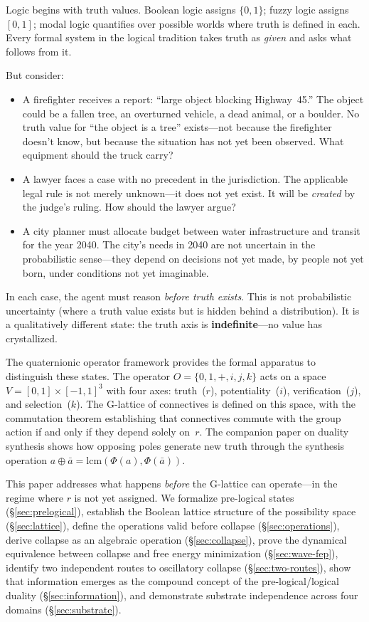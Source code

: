 \documentclass[11pt,a4paper]{article}
\begin{document}
Logic begins with truth values. Boolean logic assigns $\{0,1\}$; fuzzy
logic assigns $[0,1]$; modal logic quantifies over possible worlds where
truth is defined in each. Every formal system in the logical tradition
takes truth as \emph{given} and asks what follows from it.

But consider:
\begin{itemize}[nosep]
\item A firefighter receives a report: ``large object blocking Highway~45.''
  The object could be a fallen tree, an overturned vehicle, a dead animal,
  or a boulder. No truth value for ``the object is a tree'' exists---not
  because the firefighter doesn't know, but because the situation has not
  yet been observed. What equipment should the truck carry?
\item A lawyer faces a case with no precedent in the jurisdiction.
  The applicable legal rule is not merely unknown---it does not yet exist.
  It will be \emph{created} by the judge's ruling. How should the lawyer
  argue?
\item A city planner must allocate budget between water infrastructure and
  transit for the year 2040. The city's needs in 2040 are not uncertain in
  the probabilistic sense---they depend on decisions not yet made, by people
  not yet born, under conditions not yet imaginable.
\end{itemize}

In each case, the agent must reason \emph{before truth exists}. This is
not probabilistic uncertainty (where a truth value exists but is hidden
behind a distribution). It is a qualitatively different state: the truth
axis is \textbf{indefinite}---no value has crystallized.

The quaternionic operator framework \citep{p11} provides the formal
apparatus to distinguish these states. The operator
$O = \{0,1,+,i,j,k\}$ acts on a space $V = [0,1] \times [-1,1]^3$
with four axes: truth~($r$), potentiality~($i$), verification~($j$),
and selection~($k$). The G-lattice of connectives is defined on this
space, with the commutation theorem establishing that connectives commute
with the group action if and only if they depend solely on~$r$. The
companion paper on duality synthesis \citep{p12} shows how opposing
poles generate new truth through the synthesis operation
$a \oplus \bar{a} = \mathrm{lcm}(\Phi(a), \Phi(\bar{a}))$.

This paper addresses what happens \emph{before} the G-lattice can
operate---in the regime where $r$ is not yet assigned. We formalize
pre-logical states (\S\ref{sec:prelogical}), establish the Boolean
lattice structure of the possibility space (\S\ref{sec:lattice}), define
the operations valid before collapse (\S\ref{sec:operations}), derive
collapse as an algebraic operation (\S\ref{sec:collapse}), prove the
dynamical equivalence between collapse and free energy minimization
(\S\ref{sec:wave-fep}), identify two independent routes to oscillatory
collapse (\S\ref{sec:two-routes}), show that information emerges as
the compound concept of the pre-logical/\allowbreak logical duality
(\S\ref{sec:information}), and demonstrate substrate independence across
four domains (\S\ref{sec:substrate}).
\end{document}
